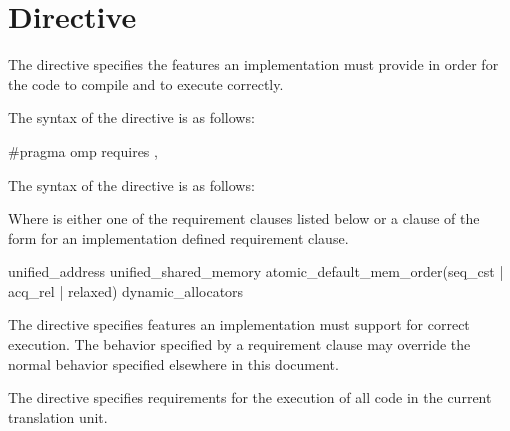 \section{ Directive}
\label{sec:requires Directive}

\summary The  directive specifies the features an implementation
must provide in order for the code to compile and to execute correctly.




\syntax
\begin{ccppspecific}
  The syntax of the  directive is as follows:

\begin{ompcPragma}
  #pragma omp requires \plc{clause[ [ [},\plc{] clause] ... ] new-line}

\end{ompcPragma}

\end{ccppspecific}

\begin{fortranspecific}
  The syntax of the  directive is as follows:


\end{fortranspecific}

Where  is either one of the requirement clauses listed below or a
clause of the form {} for an
implementation defined requirement clause.

\begin{indentedcodelist}
unified_address
unified_shared_memory
atomic_default_mem_order(seq_cst \textnormal{|} acq_rel \textnormal{|} relaxed)
dynamic_allocators
\end{indentedcodelist}

\descr

The  directive specifies features an implementation must
support for correct execution. The behavior specified by a requirement clause
may override the normal behavior specified elsewhere in this document.

\begin{ccppspecific}
The  directive specifies requirements for the execution of all
code in the current translation unit.
\end{ccppspecific}

